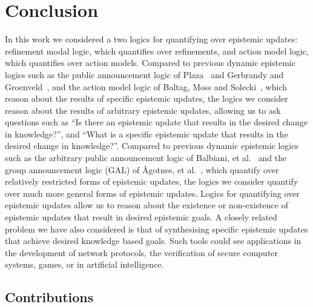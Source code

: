 \chapter{Conclusion}\label{conclusion}

In this work we considered a two logics for quantifying over epistemic updates: refinement modal logic, which quantifies over refinements, and action model logic, which quantifies over action models.
Compared to previous dynamic epistemic logics such as the public announcement logic of Plaza~\cite{plaza:1989} and Gerbrandy and Groenveld~\cite{gerbrandy:1997}, and the action model logic of Baltag, Moss and Solecki~\cite{baltag:1998,baltag:2004}, which reason about the results of specific epistemic updates, the logics we consider reason about the results of arbitrary epistemic updates, allowing us to ask questions such as ``Is there an epistemic update that results in the desired change in knowledge?'', and ``What is a specific epistemic update that results in the desired change in knowledge?''.
Compared to previous dynamic epistemic logics such as the arbitrary public announcement logic of Balbiani, et al.~\cite{balbiani:2007} and the group announcement logic (GAL) of {\AA}gotnes, et al.~\cite{agotnes:2008,agotnes:2010}, which quantify over relatively restricted forms of epistemic updates, the logics we consider quantify over much more general forms of epistemic updates.
Logics for quantifying over epistemic updates allow us to reason about the existence or non-existence of epistemic updates that result in desired epistemic goals.
A closely related problem we have also considered is that of synthesising specific epistemic updates that achieve desired knowledge based goals.
Such tools could see applications in the development of network protocols, the verification of secure computer systems, games, or in artificial intelligence.

\section{Contributions}

